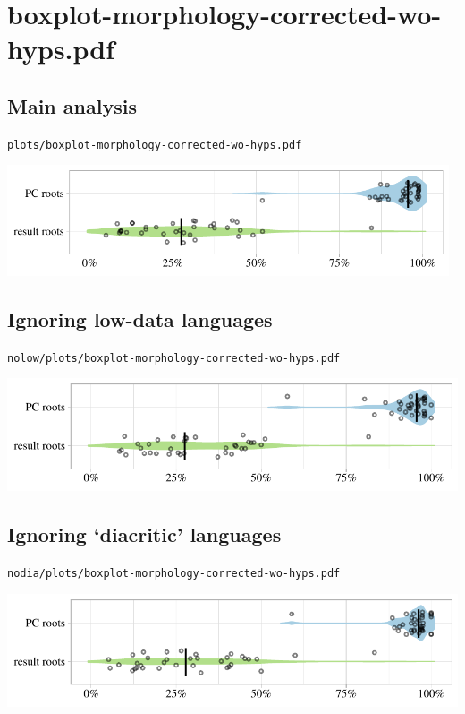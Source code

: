 \eject

\section{boxplot-morphology-corrected-wo-hyps.pdf}

\subsection{Main analysis}

\texttt{plots/boxplot-morphology-corrected-wo-hyps.pdf}

\includegraphics[width=0.98\textwidth]{../plots/boxplot-morphology-corrected-wo-hyps.pdf}

\subsection{Ignoring low-data languages}

\texttt{nolow/plots/boxplot-morphology-corrected-wo-hyps.pdf}

\includegraphics[width=1.0\textwidth]{../nolow/plots/boxplot-morphology-corrected-wo-hyps.pdf}

\subsection{Ignoring `diacritic' languages}

\texttt{nodia/plots/boxplot-morphology-corrected-wo-hyps.pdf}

\includegraphics[width=1.0\textwidth]{../nodia/plots/boxplot-morphology-corrected-wo-hyps.pdf}


